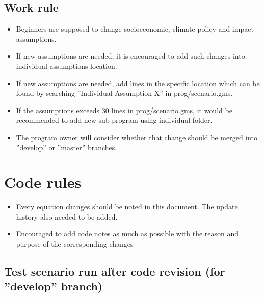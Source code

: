 \documentclass[10pt,a4paper,titlepage,dvipdfmx]{book}
\begin{document}
\subsection{\label{subsec:WorRul}Work rule}


\begin{itemize}
\item Beginners are supposed to change socioeconomic, climate policy and impact assumptions.
\item If new assumptions are needed, it is encouraged to add such changes into individual assumptions location.
\item If new assumptions are needed, add lines in the specific location which can be found by searching ''Individual Assumption X'' in prog/scenario.gms.
\item If the assumptions exceeds 30 lines in prog/scenario.gms, it would be recommended to add new sub-program using individual folder.
\item The program owner will consider whether that change should be merged into ''develop'' or ''master'' branches.
\end{itemize}
\section{\label{subsec:CoRul}Code rules}


\begin{itemize}
\item Every equation changes should be noted in this document. The update history also needed to be added.
\item Encouraged to add code notes as much as possible with the reason and purpose of the corresponding changes 
\end{itemize}
\subsection{\label{subsec:TesSceRunAftCodRev}Test scenario run after code revision (for ''develop'' branch) }
\end{document}
